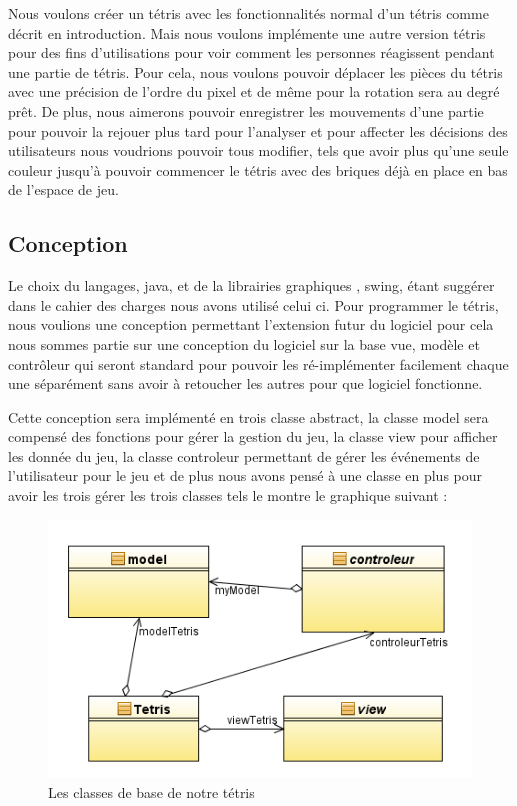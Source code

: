 \documentclass{article}           %
\begin{document}
Nous voulons créer un tétris avec les fonctionnalités normal d'un tétris comme décrit en introduction. Mais nous voulons implémente une autre version tétris pour des fins d'utilisations pour voir comment les personnes réagissent pendant une partie de tétris. Pour cela, nous voulons pouvoir déplacer les pièces du tétris avec une précision de l'ordre du pixel et de même pour la rotation sera au degré prêt. De plus, nous aimerons pouvoir enregistrer les mouvements d'une partie pour pouvoir la rejouer plus tard pour l'analyser et pour affecter les décisions des utilisateurs nous voudrions pouvoir tous modifier, tels que avoir plus qu'une seule couleur jusqu’à pouvoir commencer le tétris avec des briques déjà en place en bas de l'espace de jeu.


\subsection{Conception}
Le choix du langages, java, et de la librairies graphiques , swing, étant suggérer dans le cahier des charges nous avons utilisé celui ci. Pour programmer le tétris, nous voulions une conception permettant l’extension futur du logiciel pour cela nous sommes partie sur une conception du logiciel sur la base vue, modèle et contrôleur qui seront standard pour pouvoir les ré-implémenter facilement chaque une séparément sans avoir à retoucher les autres pour que logiciel fonctionne.

Cette conception sera implémenté en trois classe abstract, la classe model sera compensé des fonctions pour gérer la gestion du jeu, la classe view pour afficher les donnée du jeu, la classe controleur permettant de gérer les événements de l'utilisateur pour le jeu et de plus nous avons pensé à une classe en plus pour avoir les trois gérer les trois classes tels le montre le graphique suivant :


\begin{figure}[h]
   \caption{Les classes de base de notre tétris}
   \includegraphics{diagram1.png}
\end{figure}
\end{document}
